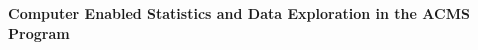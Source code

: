 
\centerline{\large \bf Computer Enabled Statistics and Data Exploration in the ACMS Program}


\hrulefill
\par
\vspace{1em}

